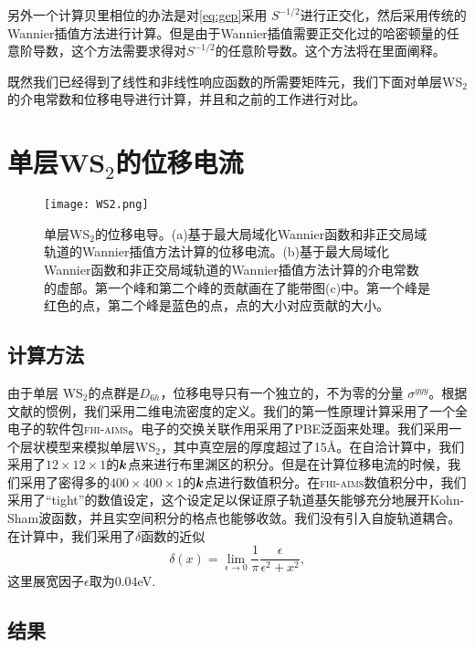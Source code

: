另外一个计算贝里相位的办法是对\ref{eq:gep}采用 $S^{-1/2}$进行正交化，然后采用传统的Wannier插值方法进行计算。但是由于Wannier插值需要正交化过的哈密顿量的任意阶导数，这个方法需要求得对$S^{-1/2}$的任意阶导数。这个方法将在里面阐释。

既然我们已经得到了线性和非线性响应函数的所需要矩阵元，我们下面对单层WS$_2$的介电常数和位移电导进行计算，并且和之前的工作进行对比。

\section{单层WS$_2$的位移电流}

\begin{figure}
    \texttt{[image: WS2.png]}
    \centering
    \caption{单层WS$_2$的位移电导。(a)基于最大局域化Wannier函数和非正交局域轨道的Wannier插值方法计算的位移电流。(b)基于最大局域化Wannier函数和非正交局域轨道的Wannier插值方法计算的介电常数的虚部。第一个峰和第二个峰的贡献画在了能带图(c)中。第一个峰是红色的点，第二个峰是蓝色的点，点的大小对应贡献的大小。\label{fig:WS2}}
\end{figure}

\subsection{计算方法}

由于单层 WS$_2$的点群是$D_{6h}$，位移电导只有一个独立的，不为零的分量 $\sigma^{yyy}$\cite{bilbao,wang_first-principles_2017}。根据文献的惯例，我们采用二维电流密度的定义。我们的第一性原理计算采用了一个全电子的软件包\textsc{fhi-aims}。电子的交换关联作用采用了PBE泛函\cite{perdew_generalized_1996}来处理。我们采用一个层状模型来模拟单层WS$_2$，其中真空层的厚度超过了15\AA。在自洽计算中，我们采用了$12\times12\times1$的$\boldsymbol{k}$点来进行布里渊区的积分。但是在计算位移电流的时候，我们采用了密得多的$400\times400\times1$的$\boldsymbol{k}$点进行数值积分。在\textsc{fhi-aims}数值积分中，我们采用了“tight”的数值设定，这个设定足以保证原子轨道基矢能够充分地展开Kohn-Sham波函数，并且实空间积分的格点也能够收敛\cite{blum_ab_2009}。我们没有引入自旋轨道耦合。在计算中，我们采用了$\delta$函数的近似
\[
\delta(x)=\lim_{\epsilon\to0}\frac{1}{\pi}\frac{\epsilon}{\epsilon^2+x^2},
\]
这里展宽因子$\epsilon$取为$0.04$eV.


\subsection{结果}

